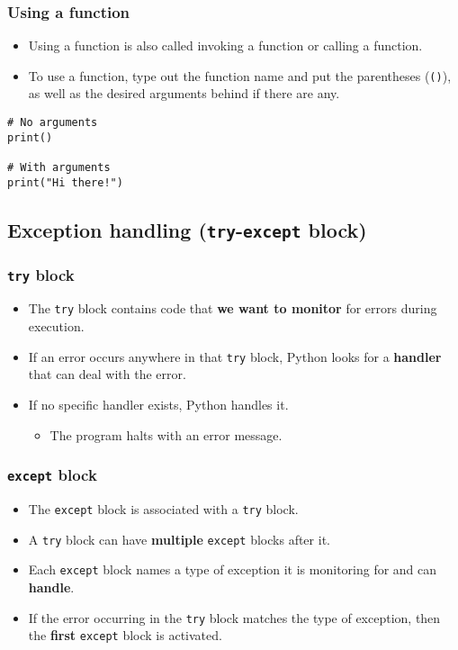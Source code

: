 \documentclass[11pt]{article}
\begin{document}
\subsubsection{Using a function}
\label{sec:orgab0b540}
\begin{itemize}
\item Using a function is also called invoking a function or calling a function.
\item To use a function, type out the function name and put the parentheses (\texttt{()}), as well as the desired arguments behind if there are any.
\end{itemize}

\begin{verbatim}
# No arguments
print()

# With arguments
print("Hi there!")
\end{verbatim}

 \newpage
\subsection{Exception handling (\texttt{try}-\texttt{except} block)}
\label{sec:org408cb25}

\subsubsection{\texttt{try} block}
\label{sec:org613342b}
\begin{itemize}
\item The \texttt{try} block contains code that \textbf{we want to monitor} for errors during execution.
\item If an error occurs anywhere in that \texttt{try} block, Python looks for a \textbf{handler} that can deal with the error.
\item If no specific handler exists, Python handles it.
\begin{itemize}
\item The program halts with an error message.
\end{itemize}
\end{itemize}
\subsubsection{\texttt{except} block}
\label{sec:org19d4701}
\begin{itemize}
\item The \texttt{except} block is associated with a \texttt{try} block.
\item A \texttt{try} block can have \textbf{multiple} \texttt{except} blocks after it.
\item Each \texttt{except} block names a type of exception it is monitoring for and can \textbf{handle}.
\item If the error occurring in the \texttt{try} block matches the type of exception, then the \textbf{first} \texttt{except} block is activated.
\end{itemize}
\end{document}
